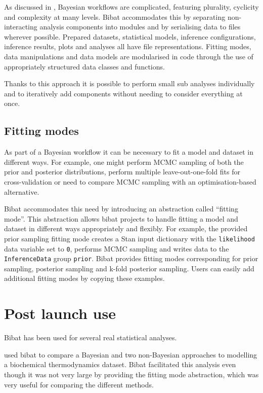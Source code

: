 \documentclass[sigconf, review]{acmart}
\begin{document}
As discussed in \citet{gelmanBayesianWorkflow2020}, Bayesian workflows
are complicated, featuring plurality, cyclicity and complexity at many
levels. Bibat accommodates this by separating non-interacting analysis
components into modules and by serialising data to files wherever
possible. Prepared datasets, statistical models, inference
configurations, inference results, plots and analyses all have file
representations. Fitting modes, data manipulations and data models are
modularised in code through the use of appropriately structured data
classes and functions.

Thanks to this approach it is possible to perform small sub analyses
individually and to iteratively add components without needing to
consider everything at once.

\subsection{Fitting modes}\label{fitting-modes}

As part of a Bayesian workflow it can be necessary to fit a model and
dataset in different ways. For example, one might perform MCMC sampling
of both the prior and posterior distributions, perform multiple
leave-out-one-fold fits for cross-validation or need to compare MCMC
sampling with an optimisation-based alternative.

Bibat accommodates this need by introducing an abstraction called
``fitting mode''. This abstraction allows bibat projects to handle
fitting a model and dataset in different ways appropriately and
flexibly. For example, the provided prior sampling fitting mode creates
a Stan input dictionary with the \texttt{likelihood} data variable set
to \texttt{0}, performs MCMC sampling and writes data to the
\texttt{InferenceData} group \texttt{prior}. Bibat provides fitting
modes corresponding for prior sampling, posterior sampling and k-fold
posterior sampling. Users can easily add additional fitting modes by
copying these examples.

\section{Post launch use}\label{post-launch-use}

Bibat has been used for several real statistical analyses.

\citet{grovesteddyDgfreg2023} used bibat to compare a Bayesian and two
non-Bayesian approaches to modelling a biochemical thermodynamics
dataset. Bibat facilitated this analysis even though it was not very
large by providing the fitting mode abstraction, which was very useful
for comparing the different methods.
\end{document}
